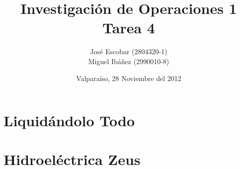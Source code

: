 \documentclass[spanish]{article}
\title{Investigaci\'on de Operaciones 1 \\ Tarea 4}
\author{José Escobar (2804320-1) \\ Miguel Ibáñez (2990010-8) }
\date{ Valparaíso, 28 Noviembre del 2012}
\begin{document}
\maketitle

\section{Liquidándolo Todo}

\newpage

\section{Hidroeléctrica Zeus}

\newpage






\end{document}
